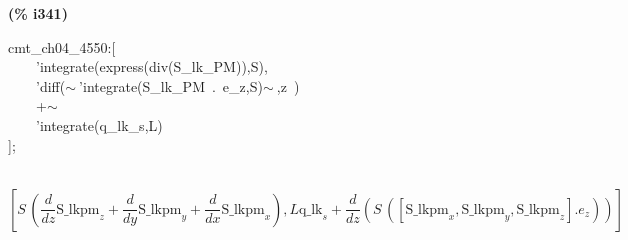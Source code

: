 \documentclass[fleqn]{article}
\begin{document}
\noindent
\begin{minipage}[t]{4.000000em}\color{red}\bfseries
(\% i341)	
\end{minipage}
\begin{minipage}[t]{\textwidth}\color{blue}
cmt\_ch04\_4550:[\\
\ \ \ \ 'integrate(express(div(S\_lk\_PM)),S),\\
\ \ \ \ 'diff(\ensuremath{\sim\ }'integrate(S\_lk\_PM\ .\ e\_z,S)\ensuremath{\sim\ },z\ )\ \\
\ \ \ \ +\ensuremath{\sim\ }\\
\ \ \ \ 'integrate(q\_lk\_s,L)\\
];\\
\\

\end{minipage}
\[\displaystyle \tag{\% o341} 
\operatorname{[}S\, \left( \frac{d}{d z} {{\ensuremath{\mathrm{S\_ lkpm}}}_z}+\frac{d}{d y} {{\ensuremath{\mathrm{S\_ lkpm}}}_y}+\frac{d}{d x} {{\ensuremath{\mathrm{S\_ lkpm}}}_x}\right) \operatorname{,}L {{\ensuremath{\mathrm{q\_ lk}}}_s}+\frac{d}{d z} \left( S\, \left( \left[ {{\ensuremath{\mathrm{S\_ lkpm}}}_x}\operatorname{,}{{\ensuremath{\mathrm{S\_ lkpm}}}_y}\operatorname{,}{{\ensuremath{\mathrm{S\_ lkpm}}}_z}\right] \ensuremath{\mathrm{ . }}{e_z}\right) \right) \operatorname{]}\mbox{}
\]
\end{document}
